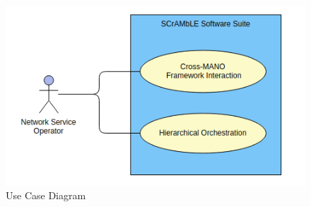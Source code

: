 \begin{figure} [h]
	\centering
	\includegraphics[width=0.9\linewidth]{figures/use-case}
	\caption{Use Case Diagram}
	\label{fig:use-case}
\end{figure}





